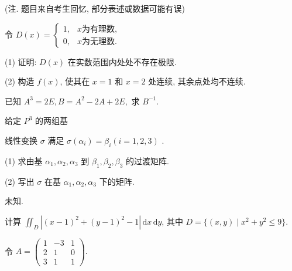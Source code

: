(注. 题目来自考生回忆, 部分表述或数据可能有误)\par
令 $D(x) = \left\{ \begin{array}{ll} 1, & x \text{为有理数}, \\ 0, & x \text{为无理数}. \end{array} \right.$\par
(1) 证明: $D(x)$ 在实数范围内处处不存在极限.\par
(2) 构造 $f(x)$, 使其在 $x = 1$ 和 $x = 2$ 处连续, 其余点处均不连续.\par
已知 $A^3 = 2E, B = A^2 - 2A + 2E,$ 求 $B^{-1}$.\par
\par{}
给定 $P^3$ 的两组基\par
\nopagebreak[4]
线性变换  $\sigma$  满足  $\sigma(\alpha_{i})=\beta_{i}(i=1,2,3)$ .\par
(1) 求由基 $\alpha_{1}, \alpha_{2}, \alpha_{3}$ 到 $\beta_{1}, \beta_{2}, \beta_{3}$ 的过渡矩阵.\par
(2) 写出 $\sigma$ 在基 $\alpha_{1}, \alpha_{2}, \alpha_{3}$ 下的矩阵.\par
未知.\par
计算 $\iint_{D} |(x - 1)^2 + (y - 1)^2 - 1| \, \mathrm{d}x \, \mathrm{d}y$, 其中 $D = \{(x, y) \mid x^2 + y^2 \leq 9\}$.\par
令 $A = \left( \begin{array}{ccc}1 & -3 & 1\\ 2 & 1 & 0\\ 3 & 1 & 1 \end{array} \right).$\par
